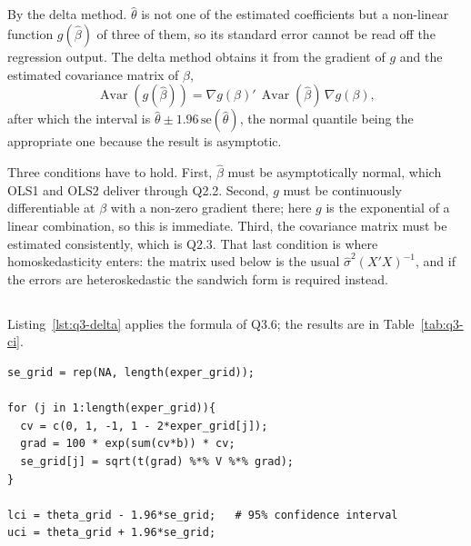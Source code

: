 \documentclass[11pt]{article}
\newcommand{\code}[1]{\texttt{#1}}
\DeclareMathOperator{\Avar}{Avar}
\begin{document}
\subsection{}
By the delta method. $\hat\theta$ is not one of the estimated coefficients but
a non-linear function $g(\hat\beta)$ of three of them, so its standard error
cannot be read off the regression output. The delta method obtains it from the
gradient of $g$ and the estimated covariance matrix of $\hat\beta$,
\[
\Avar\!\left(g(\hat\beta)\right)
= \nabla g(\beta)'\, \Avar(\hat\beta)\, \nabla g(\beta),
\]
after which the interval is $\hat\theta \pm 1.96\,\text{se}(\hat\theta)$, the
normal quantile being the appropriate one because the result is asymptotic.

Three conditions have to hold. First, $\hat\beta$ must be asymptotically
normal, which OLS1 and OLS2 deliver through Q2.2. Second, $g$ must be
continuously differentiable at $\beta$ with a non-zero gradient there; here
$g$ is the exponential of a linear combination, so this is immediate. Third,
the covariance matrix must be estimated consistently, which is Q2.3. That
last condition is where homoskedasticity enters: the matrix used below is the
usual $\hat\sigma^2(X'X)^{-1}$, and if the errors are heteroskedastic the
sandwich form is required instead.

\subsection{}
Listing~\ref{lst:q3-delta} applies the formula of Q3.6; the results are in
Table~\ref{tab:q3-ci}.

\begin{lstlisting}[style=Rcode,caption={The delta method standard error
(excerpt from \code{R/q3\_cps85\_regression.R}).},label={lst:q3-delta}]
se_grid = rep(NA, length(exper_grid));

for (j in 1:length(exper_grid)){
  cv = c(0, 1, -1, 1 - 2*exper_grid[j]);
  grad = 100 * exp(sum(cv*b)) * cv;
  se_grid[j] = sqrt(t(grad) %*% V %*% grad);
}

lci = theta_grid - 1.96*se_grid;   # 95% confidence interval
uci = theta_grid + 1.96*se_grid;
\end{lstlisting}
\end{document}
